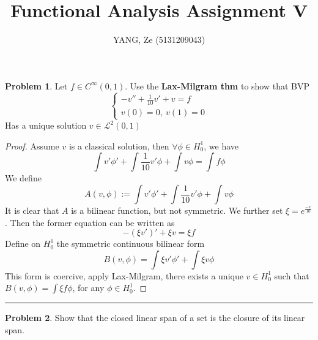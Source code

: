 \documentclass[a4paper, 10pt]{article}
\title{\textbf{Functional Analysis Assignment V}}
\author{YANG, Ze (5131209043)}
\theoremstyle{definition}
\newtheorem{problem}{Problem}
\theoremstyle{hSol}
\begin{document}
\maketitle

\begin{problem} Let $f\in C^{\infty}(0,1)$. Use the \textbf{Lax-Milgram thm} to show that BVP
$$
\begin{cases}
-v'' + \frac{1}{10}v' + v = f \\
v(0) = 0,~v(1)=0 
\end{cases}
$$
Has a unique solution $v\in \mathcal{L}^2(0,1)$
\end{problem}

\begin{proof} Assume $v$ is a classical solution, then $\forall \phi\in H_0^1$, we have
\begin{equation}
	\int v'\phi' + \int \frac{1}{10} v'\phi + \int v \phi = \int f\phi
\end{equation}
We define 
\begin{equation}
	A(v,\phi) := \int v'\phi' + \int \frac{1}{10} v'\phi + \int v \phi
\end{equation}
It is clear that $A$ is a bilinear function, but not symmetric. We further set $\xi=e^{\frac{-x}{10}}$. Then the former equation can be written as
\begin{equation}
	-(\xi v')' + \xi v = \xi f 
\end{equation}
Define on $H_0^1$ the symmetric continuous bilinear form
\begin{equation}
	B(v,\phi) = \int \xi v'\phi' + \int \xi v\phi
\end{equation}
This form is coercive, apply Lax-Milgram, there exists a unique $v\in H_0^1$ such that $B(v,\phi)=\int \xi f\phi$, for any $\phi \in H_0^1$. 
\end{proof}

\noindent\rule{16cm}{0.4pt}
\begin{problem} Show that the closed linear span of a set is the closure of its linear span.
\end{problem}
\end{document}
